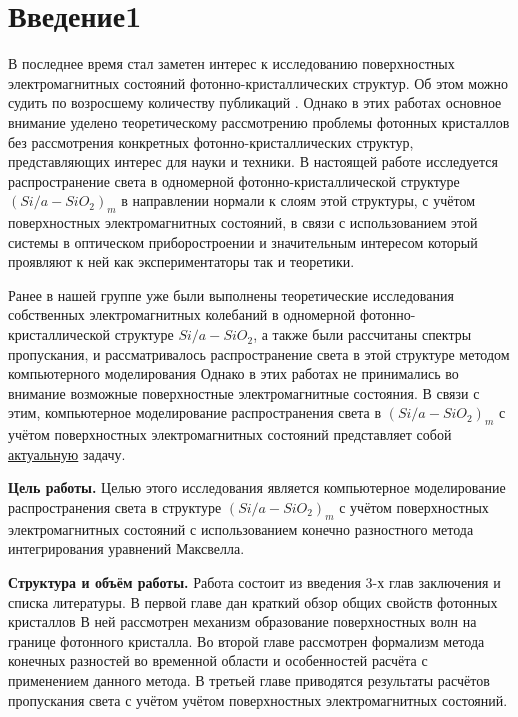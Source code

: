 \clearpage %


\section*{Введение1}

В последнее время стал заметен интерес к исследованию
поверхностных электромагнитных состояний
фотонно-кристаллических структур. Об этом можно судить
по возросшему количеству публикаций \cite{vinogr, pr_73_113113, pr_76_045305, pr_76_165125, pr_80_043806}.
Однако в этих работах основное внимание уделено теоретическому
рассмотрению проблемы фотонных кристаллов без рассмотрения
конкретных фотонно-кристаллических структур, представляющих интерес для науки и техники.
В настоящей работе исследуется распространение света в одномерной фотонно-кристаллической
структуре $(Si / a - SiO_2)_m$ в направлении нормали к слоям этой структуры,
с учётом поверхностных электромагнитных состояний, в связи с использованием этой системы
в оптическом приборостроении и значительным интересом который проявляют к ней
как экспериментаторы так и теоретики.

Ранее в нашей группе уже были выполнены теоретические исследования
собственных электромагнитных колебаний в одномерной фотонно-кристаллической структуре
$Si / a - SiO_2$\cite{fm_modelir_2009, TimShun_Vestnik_VGTU_2007, TimShunSmir_2008,
TimShunSMirKaz_SPIE_2008, TimShunSMirKaz_SPIE_2009, TimSmirShun_PhysB_2009},
а также были рассчитаны спектры пропускания,
и рассматривалось распространение света в этой структуре методом компьютерного моделирования
Однако в этих работах не принимались во внимание возможные
поверхностные электромагнитные состояния.
В связи с этим, компьютерное моделирование распространения света в $(Si / a - SiO_2)_m$ с учётом
поверхностных электромагнитных состояний представляет собой \underline{актуальную}
задачу.

{\bf Цель работы.}
Целью этого исследования является компьютерное моделирование распространения света в
структуре $(Si / a - SiO_2)_m$ с учётом поверхностных электромагнитных состояний
с использованием конечно разностного метода интегрирования уравнений Максвелла.

{\bf Структура и объём работы.}
Работа состоит из введения 3-х глав заключения
и списка литературы.
В первой главе дан краткий обзор общих свойств фотонных кристаллов
В ней рассмотрен механизм образование поверхностных волн на границе
фотонного кристалла.
Во второй главе рассмотрен формализм метода конечных разностей
во временной области и особенностей расчёта с применением
данного метода.
В третьей главе приводятся результаты расчётов пропускания
света с учётом учётом поверхностных электромагнитных состояний.
